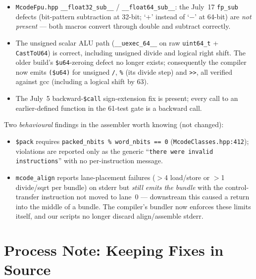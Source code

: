 \documentclass[11pt,a4paper]{report}
\begin{document}
\begin{itemize}
  \item \texttt{McodeFpu.hpp} \texttt{\_\_float32\_sub\_\_} /
        \texttt{\_\_float64\_sub\_\_}: the July~17 \texttt{fp\_sub} defects
        (bit-pattern subtraction at 32-bit; `$+$' instead of `$-$' at 64-bit)
        are \emph{not present} --- both macros convert through double and
        subtract correctly.
  \item The unsigned scalar ALU path (\texttt{\_\_uexec\_64\_\_} on raw
        \texttt{uint64\_t} + \texttt{CastToU64}) is correct, including
        unsigned divide and logical right shift. The older build's
        \texttt{\$u64}-zeroing defect no longer exists; consequently the
        compiler now emits \texttt{(\$u64)} for unsigned \texttt{/},
        \texttt{\%} (its divide step) and \texttt{>>}, all verified against
        gcc (including a logical shift by 63).
  \item The July~5 backward-\texttt{\$call} sign-extension fix is present;
        every call to an earlier-defined function in the 61-test gate is a
        backward call.
\end{itemize}

Two \emph{behavioural} findings in the assembler worth knowing (not changed):

\begin{itemize}
  \item \texttt{\$pack} requires \texttt{packed\_nbits \% word\_nbits == 0}
        (\texttt{McodeClasses.hpp:412}); violations are reported only as the
        generic ``\texttt{there were invalid instructions}'' with no
        per-instruction message.
  \item \texttt{mcode\_align} reports lane-placement failures ($>$4
        load/store or $>$1 divide/sqrt per bundle) on stderr but \emph{still
        emits the bundle} with the control-transfer instruction not moved to
        lane~0 --- downstream this caused a return into the middle of a
        bundle. The compiler's bundler now enforces these limits itself, and
        our scripts no longer discard align/assemble stderr.
\end{itemize}

\chapter{Process Note: Keeping Fixes in Source}
\label{ch:process}
\end{document}
